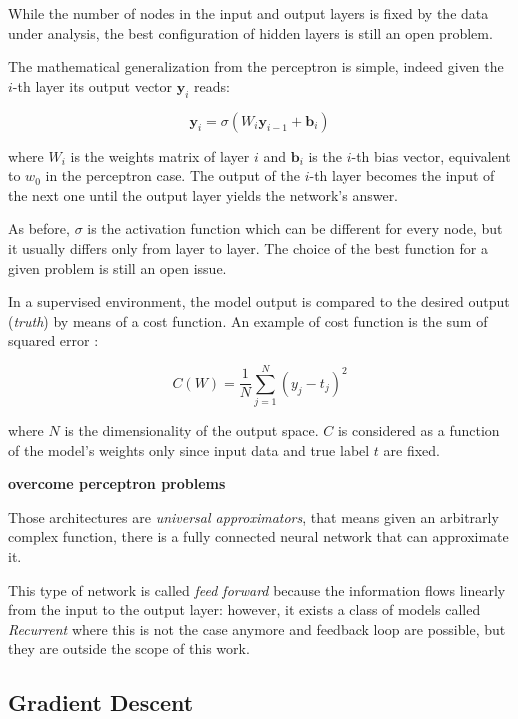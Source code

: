 \documentclass[12pt,a4paper]{report}
\begin{document}
While the number of nodes in the input and output layers is fixed by the data under analysis, the best configuration of hidden layers is still an open problem.

The mathematical generalization from the perceptron is simple, indeed given the $i$-th layer its output vector $\bm{y}_i$ reads:  

\begin{equation}
 \bm{y}_i = \sigma(W_i \bm{y}_{i-1} + \bm{b}_i)
\end{equation}

where $W_i$ is the weights matrix of layer $i$ and $\bm{b}_i$ is the $i$-th bias vector, equivalent to $w_0$ in the perceptron case.
The output of the $i$-th layer becomes the input of the next one until the output layer yields the network's answer. 

As before, $\sigma$ is the activation function which can be different for every node, but it usually differs only from layer to layer. 
The choice of the best function for a given problem is still an open issue.

In a supervised environment, the model output is compared to the desired output ({\it truth}) by means of a cost function. 
An example of cost function is the sum of squared error : 

\begin{equation}
  C(W) = \frac{1}{N} \sum_{j=1}^{N} (y_j - t_j)^2
\end{equation}

where $N$ is the dimensionality of the output space. $C$ is considered as a function of the model's weights only since input data and true label $t$ are fixed.

{\bf overcome perceptron problems}

Those architectures are {\it universal approximators}, that means given an arbitrarly complex function, there is a fully connected neural network that can approximate it.

This type of network is called {\it feed forward} because the information flows linearly from the input to the output layer: however, it exists a class of models called {\it Recurrent} where this is not the case anymore and feedback loop are possible, but they are outside the scope of this work. 

\subsection*{Gradient Descent}
\end{document}
